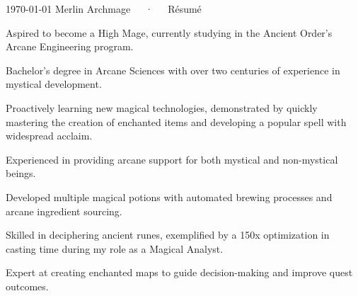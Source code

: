 \documentclass[11pt, a4paper]{awesome-cv}
\begin{document}
\makecvheader[C]

\makecvfooter
  {\today}
  {Merlin Archmage~~~·~~~Résumé}
  {\thepage}


\newcommand*{\qualstyle}[1]{{\fontsize{10.5pt}{1em}\bodyfont\color{graytext} #1}}
\vspace{6mm}
\begin{cvitems}
    
    \item{\qualstyle{Aspired to become a High Mage, currently studying
in the Ancient Order's Arcane Engineering program.}}
    
    \item{\qualstyle{Bachelor's degree in Arcane Sciences with over two
centuries of experience in mystical development.}}
    
    \item{\qualstyle{Proactively learning new magical technologies,
demonstrated by quickly mastering the creation of enchanted items and
developing a popular spell with widespread acclaim.}}
    
    \item{\qualstyle{Experienced in providing arcane support for both
mystical and non-mystical beings.}}
    
    \item{\qualstyle{Developed multiple magical potions with automated
brewing processes and arcane ingredient sourcing.}}
    
    \item{\qualstyle{Skilled in deciphering ancient runes, exemplified
by a 150x optimization in casting time during my role as a Magical
Analyst.}}
    
    \item{\qualstyle{Expert at creating enchanted maps to guide
decision-making and improve quest outcomes.}}

\end{cvitems}
\end{document}
